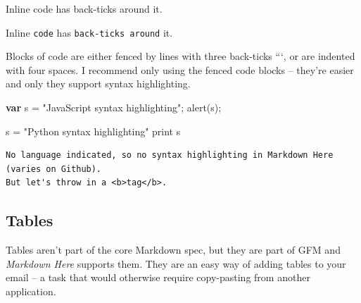 \documentclass[
]{tufte-pandoc}
\newenvironment{Shaded}{}{}
\newcommand{\BuiltInTok}[1]{#1}
\newcommand{\FunctionTok}[1]{\textcolor[rgb]{0.02,0.16,0.49}{#1}}
\newcommand{\KeywordTok}[1]{\textcolor[rgb]{0.00,0.44,0.13}{\textbf{#1}}}
\newcommand{\NormalTok}[1]{#1}
\newcommand{\OperatorTok}[1]{\textcolor[rgb]{0.40,0.40,0.40}{#1}}
\newcommand{\StringTok}[1]{\textcolor[rgb]{0.25,0.44,0.63}{#1}}
\begin{document}
\begin{Shaded}
\begin{Highlighting}[]
\NormalTok{Inline \textasciigrave{}code\textasciigrave{} has \textasciigrave{}back{-}ticks around\textasciigrave{} it.}
\end{Highlighting}
\end{Shaded}

Inline \texttt{code} has \texttt{back-ticks\ around} it.

Blocks of code are either fenced by lines with three back-ticks ```, or
are indented with four spaces. I recommend only using the fenced code
blocks -- they're easier and only they support syntax highlighting.

\begin{Shaded}
\begin{Highlighting}[]
\KeywordTok{var}\NormalTok{ s }\OperatorTok{=} \StringTok{"JavaScript syntax highlighting"}\OperatorTok{;}
\FunctionTok{alert}\NormalTok{(s)}\OperatorTok{;}
\end{Highlighting}
\end{Shaded}

\begin{Shaded}
\begin{Highlighting}[]
\NormalTok{s }\OperatorTok{=} \StringTok{"Python syntax highlighting"}
\BuiltInTok{print}\NormalTok{ s}
\end{Highlighting}
\end{Shaded}

\begin{verbatim}
No language indicated, so no syntax highlighting in Markdown Here (varies on Github).
But let's throw in a <b>tag</b>.
\end{verbatim}

\hypertarget{tables}{%
\subsection{Tables}\label{tables}}

Tables aren't part of the core Markdown spec, but they are part of GFM
and \emph{Markdown Here} supports them. They are an easy way of adding
tables to your email -- a task that would otherwise require copy-pasting
from another application.
\end{document}
